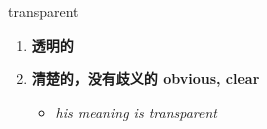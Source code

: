
\begin{frame}
{\huge transparent}
\begin{center}
\begin{enumerate}\Large
  \item \textbf{透明的}
  \item \textbf{清楚的，没有歧义的 obvious, clear}
  \begin{itemize}
    \item \em{\Large{his meaning is transparent}}
  \end{itemize}
\end{enumerate}
\end{center}
\end{frame}
